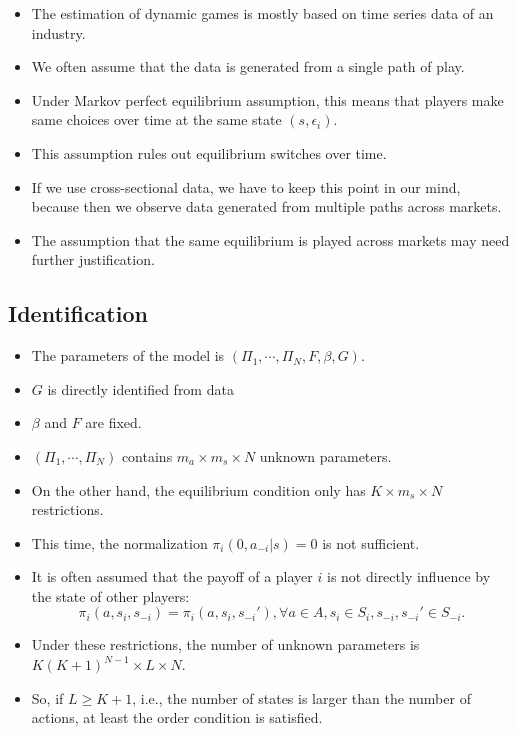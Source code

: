 \documentclass[
]{book}
\providecommand{\tightlist}{%
  \setlength{\itemsep}{0pt}\setlength{\parskip}{0pt}}
\begin{document}
\begin{itemize}
\tightlist
\item
  The estimation of dynamic games is mostly based on time series data
  of an industry.
\item
  We often assume that the data is generated from a single path of
  play.
\item
  Under Markov perfect equilibrium assumption, this means that players
  make same choices over time at the same state \((s, \epsilon_i)\).
\item
  This assumption rules out equilibrium switches over time.
\item
  If we use cross-sectional data, we have to keep this point in our
  mind, because then we observe data generated from multiple paths
  across markets.
\item
  The assumption that the same equilibrium is played across markets
  may need further justification.
\end{itemize}

\hypertarget{identification-1}{%
\subsection{Identification}\label{identification-1}}

\begin{itemize}
\tightlist
\item
  The parameters of the model is
  \((\Pi_1, \cdots, \Pi_N, F, \beta, G)\).
\item
  \(G\) is directly identified from data
\item
  \(\beta\) and \(F\) are fixed.
\item
  \((\Pi_1, \cdots, \Pi_N)\) contains \(m_a \times m_s \times N\) unknown
  parameters.
\item
  On the other hand, the equilibrium condition only has
  \(K \times m_s \times N\) restrictions.
\item
  This time, the normalization \(\pi_i(0, a_{-i}|s) = 0\) is not
  sufficient.
\item
  It is often assumed that the payoff of a player \(i\) is not directly
  influence by the state of other players: \begin{equation}
  \pi_i(a, s_i, s_{-i}) = \pi_i(a, s_i, s_{-i}'), \forall a \in A, s_i \in S_i, s_{-i}, s_{-i}' \in S_{-i}.
  \end{equation}
\item
  Under these restrictions, the number of unknown parameters is
  \(K (K + 1)^{N - 1} \times L \times N\).
\item
  So, if \(L \ge K + 1\), i.e., the number of states is larger than the
  number of actions, at least the order condition is satisfied.
\end{itemize}
\end{document}
